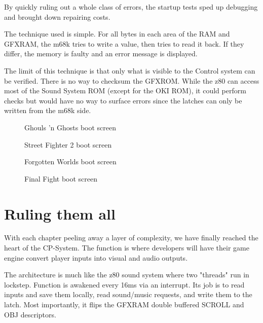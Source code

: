 By quickly ruling out a whole class of errors, the startup tests sped up debugging and brought down repairing costs.

The technique used is simple. For all bytes in each area of the RAM and GFXRAM, the m68k tries to write a value, then tries to read it back. If they differ, the memory is faulty and an error message is displayed. 

The limit of this technique is that only what is visible to the Control system can be verified. There is no way to checksum the GFXROM. While the z80 can access most of the Sound System ROM (except for the OKI ROM), it could perform checks but would have no way to surface errors since the latches can only be written from the m68k side.
\vfill
\begin{figure}[H]
\caption*{Ghouls 'n Ghosts boot screen}
\end{figure}


\begin{figure}[H]
\caption*{Street Fighter 2 boot screen}
\end{figure}










\begin{figure}[H]
\caption*{Forgotten Worlds boot screen}
\end{figure}



\vfill
\begin{figure}[H]
\caption*{Final Fight boot screen}
\end{figure}






\section{Ruling them all}
With each chapter peeling away a layer of complexity, we have finally reached the heart of the CP-System. 
The function  is where developers will have their game engine convert player inputs into visual and audio outputs.

The architecture is much like the z80 sound system where two "threads" run in lockstep. Function  is awakened every 16ms via an interrupt. Its job is to read inputs and save them locally, read sound/music requests, and write them to the latch. Most importantly, it flips the GFXRAM double buffered SCROLL and OBJ descriptors. 

